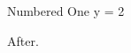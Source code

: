\documentclass{article}
\begin{document}
\begin{mylisting}{Numbered One}
y = 2
\end{mylisting}
After.
\end{document}
